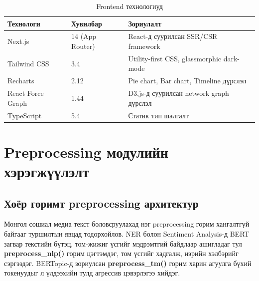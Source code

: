 \begin{table}[h!]
\centering
\renewcommand{\arraystretch}{1.4}
\begin{tabular}{|l|l|p{6cm}|}
\hline
\textbf{Технологи} & \textbf{Хувилбар} & \textbf{Зориулалт} \\ \hline
Next.js & 14 (App Router) & React-д суурилсан SSR/CSR framework \\ \hline
Tailwind CSS & 3.4 & Utility-first CSS, glassmorphic dark-mode \\ \hline
Recharts & 2.12 & Pie chart, Bar chart, Timeline дүрслэл \\ \hline
React Force Graph & 1.44 & D3.js-д суурилсан network graph дүрслэл \\ \hline
TypeScript & 5.4 & Статик тип шалгалт \\ \hline
\end{tabular}
\caption{Frontend технологиуд}
\label{tab:frontend_tech}
\end{table}

\section{Preprocessing модулийн хэрэгжүүлэлт}

\subsection{Хоёр горимт preprocessing архитектур}

Монгол сошиал медиа текст боловсруулахад нэг preprocessing горим хангалтгүй байгааг туршилтын явцад тодорхойлов. NER болон Sentiment Analysis-д BERT загвар текстийн бүтэц, том-жижиг үсгийг мэдрэмтгий байдлаар ашигладаг тул \textbf{preprocess\_nlp()} горим цэгтэмдэг, том үсгийг хадгалж, нэрийн хэлбэрийг сэргээдэг. BERTopic-д зориулсан \textbf{preprocess\_tm()} горим харин агуулга бүхий токенуудыг л үлдээхийн тулд агрессив цэвэрлэгээ хийдэг.

